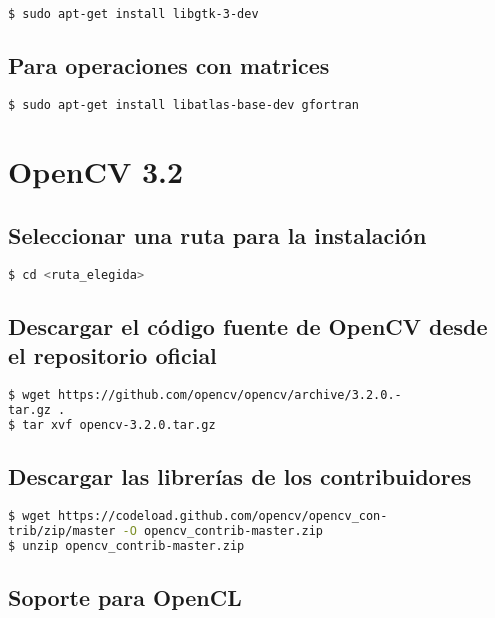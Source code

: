 \begin{lstlisting}[language=bash]
$ sudo apt-get install libgtk-3-dev
\end{lstlisting}

\subsection*{Para operaciones con matrices}

\begin{lstlisting}[language=bash]
$ sudo apt-get install libatlas-base-dev gfortran
\end{lstlisting}

\section*{OpenCV 3.2}

\subsection*{Seleccionar una ruta para la instalación}

\begin{lstlisting}[language=bash]
$ cd <ruta_elegida>
\end{lstlisting}

\subsection*{Descargar el código fuente de OpenCV desde el repositorio oficial}

\begin{lstlisting}[language=bash]
$ wget https://github.com/opencv/opencv/archive/3.2.0.-
tar.gz .
$ tar xvf opencv-3.2.0.tar.gz 
\end{lstlisting}

\subsection*{Descargar las librerías de los contribuidores}

\begin{lstlisting}[language=bash]
$ wget https://codeload.github.com/opencv/opencv_con-
trib/zip/master -O opencv_contrib-master.zip
$ unzip opencv_contrib-master.zip
\end{lstlisting}

\subsection*{Soporte para OpenCL}


